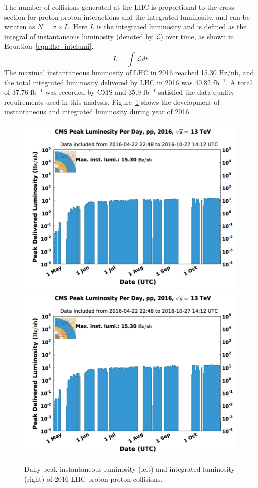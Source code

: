 \vspace{0.3cm}
The number of collisions generated at the LHC is proportional to the cross section for proton-proton interactions and the integrated luminosity, and can be written as $N=\sigma \times L$. Here $L$ is the integrated luminosity and is defined as the integral of instantaneous luminosity (denoted by $\mathcal{L}$) over time, as shown in Equation~\ref{eqn:lhc_intelumi}.
\begin{equation}
L=\int \mathcal{L}dt
\label{eqn:lhc_intelumi}
\end{equation}
The maximal instantaneous luminosity of LHC in 2016 reached 15.30 Hz/nb, and the total integrated luminosity delivered by LHC in 2016 was 40.82 fb$^{-1}$. A total of 37.76 fb$^{-1}$ was recorded by CMS and 35.9 fb$^{-1}$ satisfied the data quality requirements used in this analysis. Figure~\ref{fig:lhc_lumi2016} shows the development of instantaneous and integrated luminosity during year of 2016.

\begin{figure}[htbp]
\begin{center}
\includegraphics[width=0.49\linewidth, page=1]{figures/lhc_lumi2016.pdf}
\includegraphics[width=0.49\linewidth, page=2]{figures/lhc_lumi2016.pdf}
\caption{Daily peak instantaneous luminosity (left) and integrated luminosity (right) of 2016 LHC proton-proton collisions.}
\label{fig:lhc_lumi2016}
\end{center}
\end{figure}

